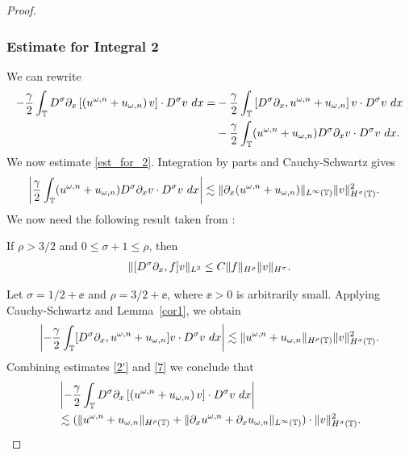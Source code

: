 \begin{proof}
\subsubsection{Estimate for Integral 2} We can rewrite
%
%
\begin{equation}
\begin{split}
-\frac{\gamma}{2} \int_{\mathbb{T}} D^\sigma \partial_x \left[ \left( u^{\omega,n} + 
u_{\omega,n}
\right)v \right] \cdot D^\sigma v \ dx
= & -\frac{\gamma}{2}\int_{\mathbb{T}} \left[ D^\sigma \partial_x , u^{\omega,n} + 
u_{\omega,n}
\right]v \cdot D^\sigma v \ dx
\\
& - \frac{\gamma}{2} \int_{\mathbb{T}} (u^{\omega,n} + u_{\omega,n})
D^\sigma \partial_x v \cdot
D^\sigma v \ dx.
\label{est_for_2}
\end{split}
\end{equation}
%
%
We now estimate \eqref{est_for_2}. Integration 
by parts and Cauchy-Schwartz gives 
%
%
\begin{equation}
\begin{split}
\left | \frac{\gamma}{2} \int_{\mathbb{T}} (u^{\omega,n} + u_{\omega,n})
D^\sigma \partial_x v \cdot
D^\sigma v \ dx \right |
& \lesssim \|\partial_x(u^{\omega,n} + u_{\omega,n}) \|_{L^\infty(\mathbb{T})}
\|v\|_{H^\sigma(\mathbb{T})}^2.
\label{2'}
\end{split}
\end{equation}
%
%
We now need the following result
taken from \cite{Himonas:2010}:
%
\begin{lemma}
\label{cor1}
If $\rho > 3/2$ and $0 \le \sigma + 1 \le \rho$, then
%
%
\begin{equation}
\begin{split}
\|[D^\sigma \partial_x ,f]v\|_{L^2} \le C \|f\|_{H^\rho} \|v\|_{H^\sigma}.
\label{15}
\end{split}
\end{equation}
%
%
\end{lemma}
%
Let $\sigma = 1/2 + \ee$ and $\rho = 3/2 + \ee$, where 
$\ee > 0$ is
arbitrarily small. Applying Cauchy-Schwartz and Lemma~\ref{cor1}, we obtain 
%
%
%
%
%
\begin{equation}
\begin{split}
\left | -\frac{\gamma}{2} \int_{\mathbb{T}} [D^\sigma \partial_x , u^{\omega,n} + 
u_{\omega,n}]v
\cdot D^\sigma v \ dx \right | \lesssim \|u^{\omega,n} +
u_{\omega,n}\|_{H^{\rho}(\mathbb{T})} \|v\|_{H^\sigma(\mathbb{T})}^2.
\label{7}
\end{split}
\end{equation}
%
%
Combining estimates \eqref{2'} and \eqref{7} we conclude that
%
%
\begin{equation}
\begin{split}
& \left | -\frac{\gamma}{2} \int_{\mathbb{T}} D^\sigma \partial_x \left[ \left( 
u^{\omega,n} + u_{\omega,n}
\right)v \right]  \cdot D^\sigma v \ dx \right |
\\
& \lesssim (\|u^{\omega,n} + u_{\omega,n}\|_{H^{\rho}(\mathbb{T})} + \|\partial_x 
u^{\omega,n} +
\partial_x u_{\omega,n}\|_{L^\infty(\mathbb{T})} ) \cdot \|v\|_{H^\sigma(\mathbb{T})}^2.
\label{8}
\end{split}
\end{equation}
%
%
%


\end{proof}
